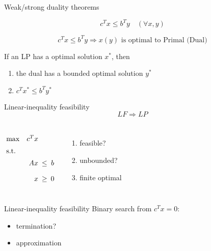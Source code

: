 \begin{frame}{Weak/strong duality theorems}
  \begin{theorem}
	\[
	  c^{T} x \leq b^{T} y	\quad (\forall x, y)
	\]
  \end{theorem}

  \begin{corollary}[29.9]
	\[
	  c^{T} x \leq b^{T} y \Rightarrow x (y) \text{ is optimal to Primal (Dual)} 
	\]
  \end{corollary}

  \begin{theorem}
	If an LP has a  optimal solution $x^{\ast}$, then
	\begin{enumerate}
	  \item the dual has a bounded optimal solution $y^{\ast}$
	  \item $c^{T} x^{\ast} \leq b^{T} y^{\ast}$
	\end{enumerate}
  \end{theorem}
\end{frame}
\begin{frame}{Linear-inequality feasibility}
  \[
	LF \Rightarrow LP
  \]

  \vspace{0.30cm}

  \begin{columns}
	  \begin{equation*}
		\setlength\arraycolsep{2.5pt}
		\begin{array}{l@{\quad}rcc}
		  \max 	& c^{T}x	&	&	\\[5pt]
		  \text{s.t.} 	&	&	&	\\[5pt]
		  &	Ax 	&	\leq	&	b	\\[10pt]
		  &	x	& 	\geq 	&	0	
		\end{array}
	  \end{equation*}
	  \begin{enumerate}
		\item feasible?
		\item unbounded?
		\item finite optimal
	  \end{enumerate}
  \end{columns}
\end{frame}
\begin{frame}{Linear-inequality feasibility}
  Binary search from $c^{T} x = 0$:

  \begin{itemize}
	\item termination?
	\item approximation
  \end{itemize}
\end{frame}
